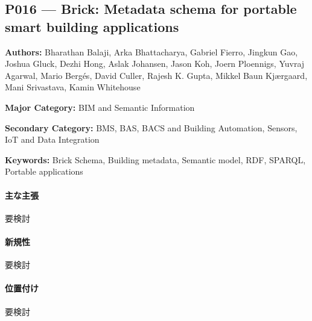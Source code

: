 \subsection{P016 --- Brick: Metadata schema for portable smart building applications}
\label{paper:P016}
\textbf{Authors:} Bharathan Balaji, Arka Bhattacharya, Gabriel Fierro, Jingkun Gao, Joshua Gluck, Dezhi Hong, Aslak Johansen, Jason Koh, Joern Ploennigs, Yuvraj Agarwal, Mario Bergés, David Culler, Rajesh K. Gupta, Mikkel Baun Kjærgaard, Mani Srivastava, Kamin Whitehouse\par
\textbf{Major Category:} BIM and Semantic Information\par
\textbf{Secondary Category:} BMS, BAS, BACS and Building Automation, Sensors, IoT and Data Integration\par
\textbf{Keywords:} Brick Schema, Building metadata, Semantic model, RDF, SPARQL, Portable applications\par
\paragraph{主な主張}
要検討 \cite{Balaji:2018Brick}
\paragraph{新規性}
要検討
\paragraph{位置付け}
要検討
